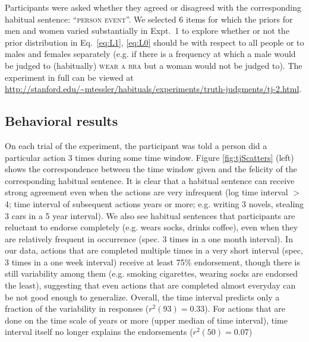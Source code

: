 \documentclass[10pt,letterpaper]{article}
\begin{document}
Participants were asked whether they agreed or disagreed with the corresponding habitual sentence: ``\textsc{person event}''.
We selected 6 items for which the priors for men and women varied substantially in Expt.~1 to explore whether or not the prior distribution in Eq.~\ref{eq:L1}, \ref{eq:L0} should be with respect to all people or to males and females separately (e.g. if there is a frequency at which a male would be judged to (habitually) \textsc{wear a bra} but a woman would not be judged to). 
The experiment in full can be viewed at \url{http://stanford.edu/~mtessler/habituals/experiments/truth-judgments/tj-2.html}.



\subsection{Behavioral results}

On each trial of the experiment, the participant was told a person did a particular action 3 times during some time window. 
Figure \ref{fig:tjScatters} (left) shows the correspondence between the time window given and the felicity of the corresponding habitual sentence. 
It is clear that a habitual sentence can receive strong agreement even when the actions are very infrequent (log time interval $>$ 4; time interval of subsequent actions years or more; e.g. writing 3 novels, stealing 3 cars in a 5 year interval).
We also see habitual sentences that participants are reluctant to endorse completely (e.g. wears socks, drinks coffee), even when they are relatively frequent in occurrence (spec. 3 times in a one month interval).
In our data, actions that are completed multiple times in a very short interval (spec, 3 times in a one week interval) receive at least 75\% endorsement, though there is still variability among them (e.g. smoking cigarettes, wearing socks are endorsed the least), suggesting that even actions that are completed almost everyday can be not good enough to generalize.
Overall, the time interval predicts only a fraction of the variability in responses ($r^2(93) = 0.33$).
For actions that are done on the time scale of years or more (upper median of time interval), time interval itself no longer explains the endorsements  ($r^2(50) = 0.07$)
\end{document}
